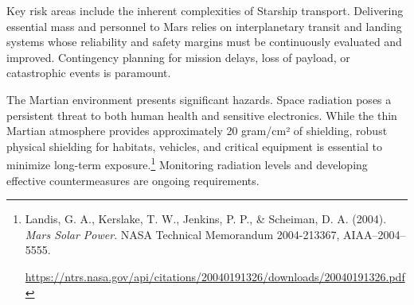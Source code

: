 \documentclass[fontsize=10pt, oneside, DIV=calc]{scrartcl}
\begin{document}
\medskip

\noindent
Key risk areas include the inherent complexities of Starship transport. Delivering essential mass and personnel to Mars relies on interplanetary transit and landing systems whose reliability and safety margins must be continuously evaluated and improved. Contingency planning for mission delays, loss of payload, or catastrophic events is paramount.

\medskip

\noindent
The Martian environment presents significant hazards. Space radiation poses a persistent threat to both human health and sensitive electronics. While the thin Martian atmosphere provides approximately 20 gram/cm² of shielding, robust physical shielding for habitats, vehicles, and critical equipment is essential to minimize long-term exposure.\footnote{Landis, G. A., Kerslake, T. W., Jenkins, P. P., \& Scheiman, D. A. (2004). \textit{Mars Solar Power}. NASA Technical Memorandum 2004-213367, AIAA–2004–5555. 







\href{https://ntrs.nasa.gov/api/citations/20040191326/downloads/20040191326.pdf}\url{https://ntrs.nasa.gov/api/citations/20040191326/downloads/20040191326.pdf}} Monitoring radiation levels and developing effective countermeasures are ongoing requirements.

\medskip
\end{document}
